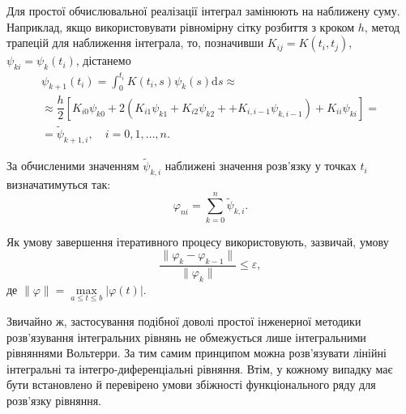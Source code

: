 \documentclass[14pt,twoside]{extreport}
\theoremstyle{mystyle}
\numberwithin{equation}{chapter}
\begin{document}
Для простої обчислювальної реалізації інтеграл замінюють на наближену суму. Наприклад, якщо використовувати рівномірну сітку розбиття з кроком $h$, метод трапецій для наближення інтеграла, то, позначивши $K_{ij} = K(t_i, t_j)$, $\psi_{ki} = \psi_k(t_i)$, дістанемо
\begin{multline}
\displaystyle\psi_{k+1}(t_{i})=\int_0^{t_i} K(t_{i},s)\psi_{k}(s)\mathrm{d}s\approx \\
\approx\dfrac{h}{2}\left[K_{i0}\psi_{k0}+2 (K_{i1}\psi_{k1}+K_{i2}\psi_{k2}+ +K_{i,i-1}\psi_{k,i-1})+K_{ii}\psi_{ki}\right]=\\
=\tilde{\psi}_{k+1,i},\quad i=0, 1, \ldots, n.
\end{multline}

За обчисленими значенням $\tilde{\psi}_{k,i}$ наближені значення розв'язку у точках $t_i$ визначатимуться так:
\[
\varphi_{ni}=\displaystyle \sum_{k=0}^{n}\tilde{\psi}_{k,i}.
\]

Як умову завершення ітеративного процесу використовують, зазвичай, умову
\[
\dfrac{\|\varphi_{k}-\varphi_{k-1}\|}{\|\varphi_{k}\|}\leqslant\varepsilon,
\]
де $\|\varphi\| = \max\limits_{a\leqslant t\leqslant b} |\varphi(t)|$.

Звичайно ж, застосування подібної доволі простої інженерної методики розв'язування інтегральних рівнянь не обмежується лише інтегральними рівняннями Вольтерри. За тим самим принципом можна розв'язувати лінійні інтегральні та інтегро-диференціальні рівняння. Втім, у кожному випадку має бути встановлено й перевірено умови збіжності функціонального ряду для розв'язку рівняння.
\end{document}

